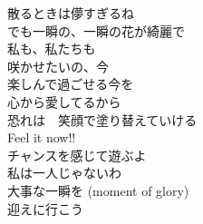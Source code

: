 {散るときは儚すぎるね\\
でも一瞬の、一瞬の花が綺麗で\\
私も、私たちも\\
咲かせたいの、今\\

楽しんで過ごせる今を\\
心から愛してるから\\
恐れは　笑顔で塗り替えていける\\
Feel it now!!\\
チャンスを感じて遊ぶよ\\
私は一人じゃないわ\\
大事な一瞬を (moment of glory)\\
迎えに行こう
}
